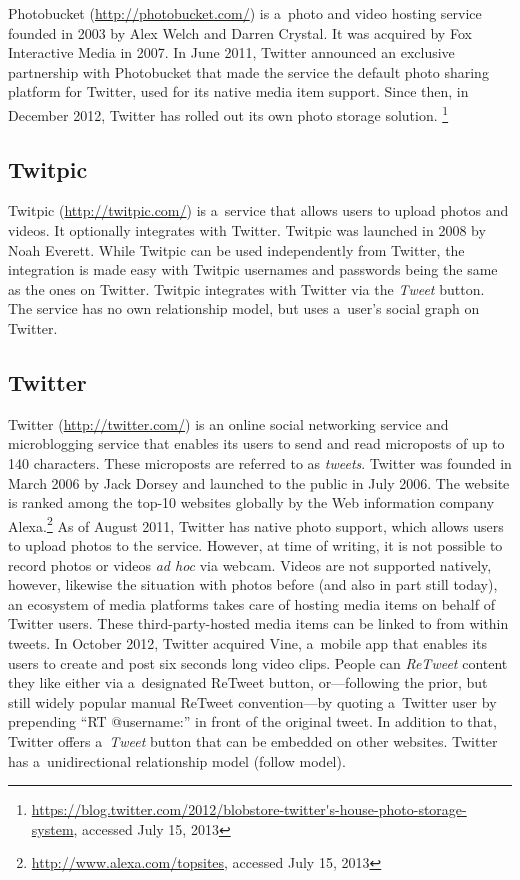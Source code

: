 Photobucket (\url{http://photobucket.com/})
is a~photo and video hosting service
founded in 2003 by Alex Welch and Darren Crystal.
It was acquired by Fox Interactive Media in 2007.
In June 2011, Twitter announced an exclusive partnership
with Photobucket that made the service
the default photo sharing platform for Twitter,
used for its native media item support.
Since then, in December 2012,
Twitter has rolled out its own photo storage solution.%
\footnote{\url{https://blog.twitter.com/2012/blobstore-twitter's-house-photo-storage-system}, accessed July 15, 2013}

\subsection{Twitpic}

Twitpic (\url{http://twitpic.com/})
is a~service that allows users to upload photos and videos.
It optionally integrates with Twitter.
Twitpic was launched in 2008 by Noah Everett.
While Twitpic can be used independently from Twitter,
the integration is made easy with Twitpic usernames and passwords
being the same as the ones on Twitter.
Twitpic integrates with Twitter via the \emph{Tweet} button.
The service has no own relationship model,
but uses a~user's social graph on Twitter.

\subsection{Twitter}
\label{sec:twitter}

Twitter (\url{http://twitter.com/})
is an online social networking service
and microblogging service
that enables its users to send and read microposts
of up to 140 characters.
These microposts are referred to as \emph{tweets}.
Twitter was founded in March 2006 by Jack Dorsey
and launched to the public in July 2006.
The website is ranked among the top-10 websites globally
by the Web information company
Alexa.\footnote{\url{http://www.alexa.com/topsites},
accessed July 15, 2013}
As of August 2011, Twitter has native photo support,
which allows users to upload photos to the service.
However, at time of writing, it is not possible to
record photos or videos \emph{ad hoc} via webcam.
Videos are not supported natively, however,
likewise the situation with photos before
(and also in part still today),
an ecosystem of media platforms takes care of
hosting media items on behalf of Twitter users.
These third-party-hosted media items
can be linked to from within tweets.
In October 2012, Twitter acquired Vine,
a~mobile app that enables its users to create
and post six seconds long video clips.
People can \emph{ReTweet} content they like either
via a~designated ReTweet button,
or---following the prior, but still widely popular
manual ReTweet convention---by
quoting a~Twitter user by prepending ``RT @username:''
in front of the original tweet.
In addition to that, Twitter offers
a~\emph{Tweet} button that can be embedded on other websites.
Twitter has a~unidirectional relationship model (follow model).

